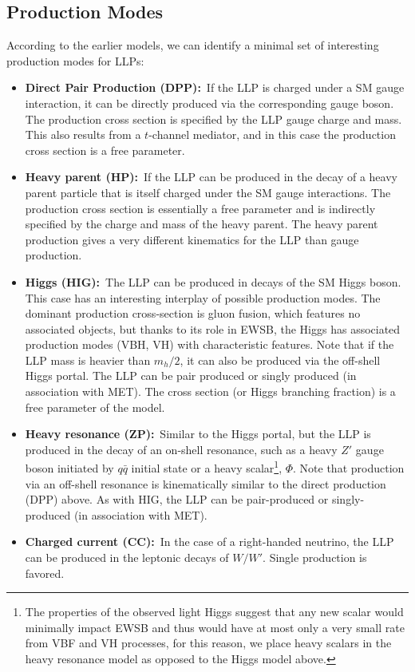 \subsection{Production Modes}
According to the earlier models, we can identify a minimal set of interesting production modes for LLPs:
%
\begin{itemize}
\item {\bf Direct Pair Production (DPP):}~If the LLP is charged under a SM gauge interaction, it can be directly produced via the corresponding gauge boson. The production cross section is specified by the LLP gauge charge and mass. This also results from a $t$-channel mediator, and in this case the production cross section is a free parameter.
\item {\bf Heavy parent (HP):}~If the LLP can be produced in the decay of a heavy parent particle that is itself charged under the SM gauge interactions. The production cross section is essentially a free parameter and is indirectly specified by the charge and mass of the heavy parent. The heavy parent production gives a very different kinematics for the LLP than gauge production.
\item {\bf Higgs (HIG):}~The LLP can be produced in decays of the SM Higgs boson.  This case has an interesting interplay of possible production modes. The dominant production cross-section is  gluon fusion, which features no associated objects, but thanks to its role in EWSB, the Higgs has associated production modes (VBH, VH) with characteristic features. Note that if the LLP mass is heavier than $m_h/2$, it can also be produced via the off-shell Higgs portal. The LLP can be pair produced or singly produced (in association with MET). The cross section (or Higgs branching fraction) is a free parameter of the model.
\item {\bf Heavy resonance (ZP):}~Similar to the Higgs portal, but the LLP is produced in the decay of an on-shell resonance, such as a heavy $Z'$ gauge boson initiated by $q\bar{q}$ initial state or a heavy scalar\footnote{The properties of the observed light Higgs suggest that any new scalar would minimally impact EWSB and thus would have at most only a very small rate from VBF and VH processes, for this reason, we place heavy scalars in the heavy resonance model as opposed to the Higgs model above.}, $\Phi$.  Note that production via an off-shell resonance is kinematically similar to the direct production (DPP) above.  As with HIG, the LLP can be pair-produced or singly-produced (in association with MET). 
\item {\bf Charged current (CC):}~In the case of a right-handed neutrino, the LLP can be produced in the leptonic decays of $W/W'$. Single production is favored.
\end{itemize}

